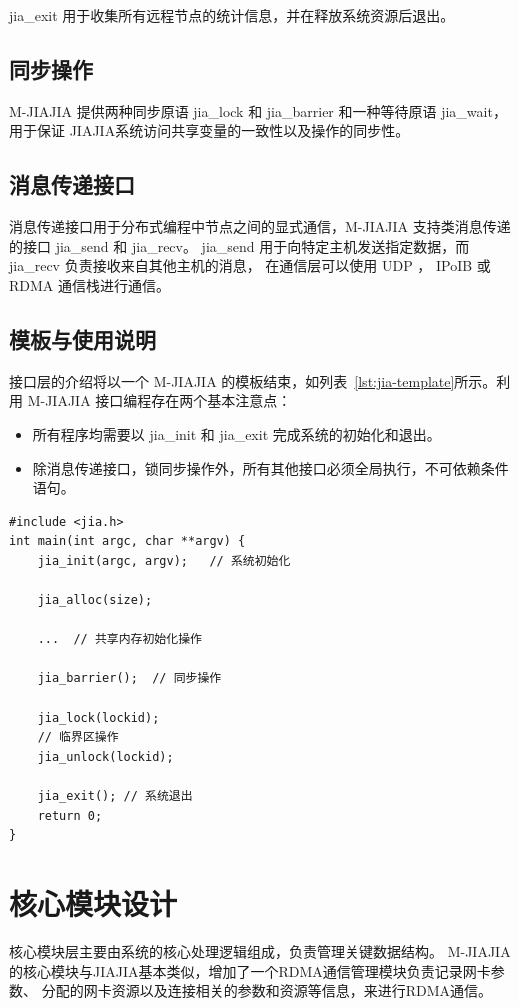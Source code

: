 {    jia\_exit 用于收集所有远程节点的统计信息，并在释放系统资源后退出。
    \subsection{同步操作}
    M-JIAJIA 提供两种同步原语 jia\_lock 和 jia\_barrier 和一种等待原语 jia\_wait，
    用于保证 JIAJIA系统访问共享变量的一致性以及操作的同步性。

    \subsection{消息传递接口}
    消息传递接口用于分布式编程中节点之间的显式通信，M-JIAJIA 支持类消息传递的接口 jia\_send 和 jia\_recv。
    jia\_send 用于向特定主机发送指定数据，而 jia\_recv 负责接收来自其他主机的消息，
    在通信层可以使用 UDP ， IPoIB 或 RDMA 通信栈进行通信。

    \newpage
    \subsection{模板与使用说明}
    接口层的介绍将以一个 M-JIAJIA 的模板结束，如列表~\ref{lst:jia-template}所示。利用 M-JIAJIA 接口编程存在两个基本注意点：
    \begin{itemize}
        \item 所有程序均需要以 jia\_init 和 jia\_exit 完成系统的初始化和退出。
        \item 除消息传递接口，锁同步操作外，所有其他接口必须全局执行，不可依赖条件语句。
    \end{itemize}
    \begin{lstlisting}[style=CStyle, caption={M-JIAJIA 应用模板}, label={lst:jia-template}]
#include <jia.h>
int main(int argc, char **argv) {
    jia_init(argc, argv);   // 系统初始化

    jia_alloc(size);
    
    ...  // 共享内存初始化操作

    jia_barrier();  // 同步操作    

    jia_lock(lockid);
    // 临界区操作
    jia_unlock(lockid);
    
    jia_exit(); // 系统退出
    return 0;
}
    \end{lstlisting}

    \section{核心模块设计}
    核心模块层主要由系统的核心处理逻辑组成，负责管理关键数据结构。
    M-JIAJIA的核心模块与JIAJIA基本类似，增加了一个RDMA通信管理模块负责记录网卡参数、
    分配的网卡资源以及连接相关的参数和资源等信息，来进行RDMA通信。

}
